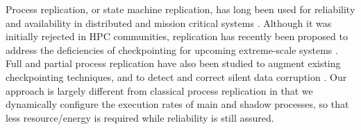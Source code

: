 Process replication, or state machine replication, has long been used for reliability and availability in distributed and mission critical systems \cite{schneider_1990_tutorial,Sousa2005,5470865}. %
Although it was initially rejected in HPC communities, 
replication has recently been proposed to address the deficiencies of checkpointing for upcoming extreme-scale systems \cite{Cappello:09:Fault,engelmann2011redundant}. 
Full and partial
process replication have also been studied to augment existing checkpointing techniques, and to  
detect and correct silent data corruption \cite{stearly_2012_partial,elliott_2012_cpr,ferreira_sc_2011,fiala_2012_sdc,ni_2013_acr}. %
Our approach is largely different from classical process replication in that we dynamically configure the execution rates of main and shadow processes, so that less resource/energy is required while reliability is still assured.  


